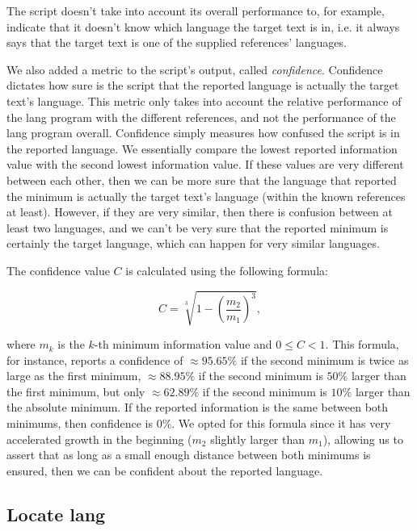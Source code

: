 \documentclass{article}
\begin{document}
The script doesn't take into account its overall performance to, for example, indicate that it doesn't know which language the target text is in, i.e. it always says that the target text is one of the supplied references' languages.

We also added a metric to the script's output, called \textit{confidence}.
Confidence dictates how sure is the script that the reported language is actually the target text's language.
This metric only takes into account the relative performance of the lang program with the different references, and not the performance of the lang program overall.
Confidence simply measures how confused the script is in the reported language.
We essentially compare the lowest reported information value with the second lowest information value.
If these values are very different between each other, then we can be more sure that the language that reported the minimum is actually the target text's language (within the known references at least).
However, if they are very similar, then there is confusion between at least two languages, and we can't be very sure that the reported minimum is certainly the target language, which can happen for very similar languages.

The confidence value $C$ is calculated using the following formula:

\begin{equation}
    \label{eq:find_lang_confidence}
    C = \sqrt[3]{1 - \left( \frac{m_2}{m_1} \right) ^3},
\end{equation}

where $m_k$ is the $k$-th minimum information value and $0 \leq C < 1$.
This formula, for instance, reports a confidence of $\approx 95.65\%$ if the second minimum is twice as large as the first minimum, $\approx 88.95\%$ if the second minimum is $50\%$ larger than the first minimum, but only $\approx 62.89\%$ if the second minimum is $10\%$ larger than the absolute minimum.
If the reported information is the same between both minimums, then confidence is $0\%$.
We opted for this formula since it has very accelerated growth in the beginning ($m_2$ slightly larger than $m_1$), allowing us to assert that as long as a small enough distance between both minimums is ensured, then we can be confident about the reported language.

\subsection{Locate lang}
\label{subsec:methodology_locate_lang}
\end{document}
